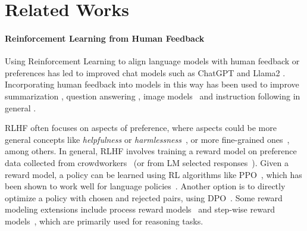 

\section{Related Works}

\paragraph{Reinforcement Learning from Human Feedback}
Using Reinforcement Learning to align language models with human feedback or preferences \citep{christiano2017deep, ziegler2019fine} has led to improved chat models such as ChatGPT \citep{ChatGPT} and Llama2 \citep{touvron2023llama}. Incorporating human feedback into models in this way has been used to improve summarization \citep{stiennon2020learning, wu2021recursively}, question answering \citep{nakano2021webgpt}, image models~\citep{lee2023aligning} and instruction following in general \citep{ouyang2022training}. 

RLHF often focuses on aspects of preference, where aspects could be more general concepts like \textit{helpfulness} or \textit{harmlessness}~\citep{bai2022training}, or more fine-grained ones~\citep{wu2023fine}, among others. 
In general, RLHF involves training a reward model on preference data collected from crowdworkers~\citep{wang2024secrets} (or from LM selected responses~\citep{bai2022constitutional}). 
Given a reward model, a policy can be learned using RL algorithms like PPO~\citep{schulman2017proximal}, which has been shown to work well for language policies~\citep{Ramamurthy2022IsRL}. 
Another option is to directly optimize a policy with chosen and rejected pairs, using DPO~\citep{rafailov2023direct}. Some reward modeling extensions include process reward models~\citep{luo2023wizardmath,lightman2023let} and step-wise reward models~\citep{havrilla2024glore}, which are primarily used for reasoning tasks.%

